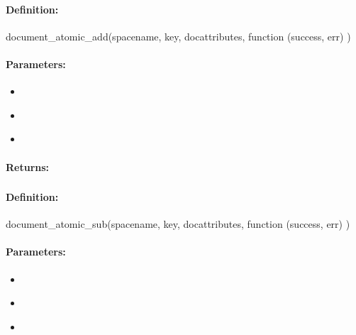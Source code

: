 \paragraph{Definition:}
\begin{javascriptcode}
document_atomic_add(spacename, key, docattributes, function (success, err) {})
\end{javascriptcode}
\paragraph{Parameters:}
\begin{itemize}[noitemsep]
\item {}\\

\item {}\\

\item {}\\

\end{itemize}

\paragraph{Returns:}


\pagebreak
\subsubsection{}
\label{api:nodejs:document_atomic_sub}


\paragraph{Definition:}
\begin{javascriptcode}
document_atomic_sub(spacename, key, docattributes, function (success, err) {})
\end{javascriptcode}
\paragraph{Parameters:}
\begin{itemize}[noitemsep]
\item {}\\

\item {}\\

\item {}\\

\end{itemize}

